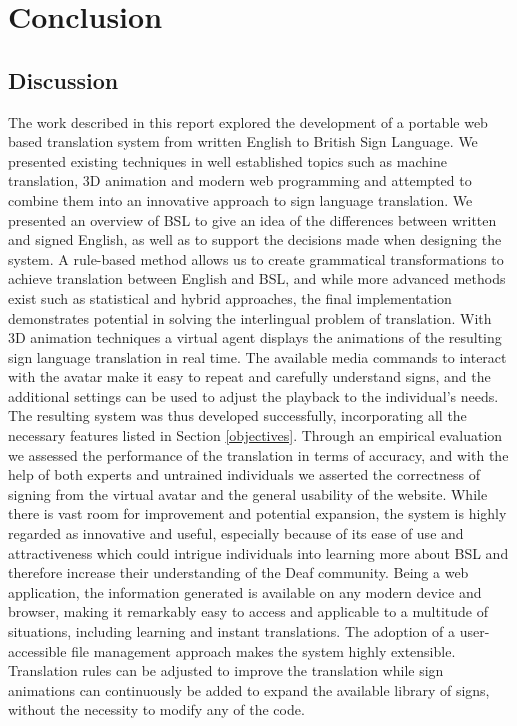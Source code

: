 \documentclass[12pt]{ociamthesis}  %
\begin{document}
\chapter{Conclusion}
\section{Discussion}
The work described in this report explored the development of a portable web based translation system from written English to British Sign Language. We presented existing techniques in well established topics such as machine translation, 3D animation and modern web programming and attempted to combine them into an innovative approach to sign language translation. We presented an overview of BSL to give an idea of the differences between written and signed English, as well as to support the decisions made when designing the system. A rule-based method allows us to create grammatical transformations to achieve translation between English and BSL, and while more advanced methods exist such as statistical and hybrid approaches, the final implementation demonstrates potential in solving the interlingual problem of translation. With 3D animation techniques a virtual agent displays the animations of the resulting sign language translation in real time. The available media commands to interact with the avatar make it easy to repeat and carefully understand signs, and the additional settings can be used to adjust the playback to the individual's needs. The resulting system was thus developed successfully, incorporating all the necessary features listed in Section \ref{objectives}. Through an empirical evaluation we assessed the performance of the translation in terms of accuracy, and with the help of both experts and untrained individuals we asserted the correctness of signing from the virtual avatar and the general usability of the website. While there is vast room for improvement and potential expansion, the system is highly regarded as innovative and useful, especially because of its ease of use and attractiveness which could intrigue individuals into learning more about BSL and therefore increase their understanding of the Deaf community. Being a web application, the information generated is available on any modern device and browser, making it remarkably easy to access and applicable to a multitude of situations, including learning and instant translations. The adoption of a user-accessible file management approach makes the system highly extensible. Translation rules can be adjusted to improve the translation while sign animations can continuously be added to expand the available library of signs, without the necessity to modify any of the code.
\end{document}

